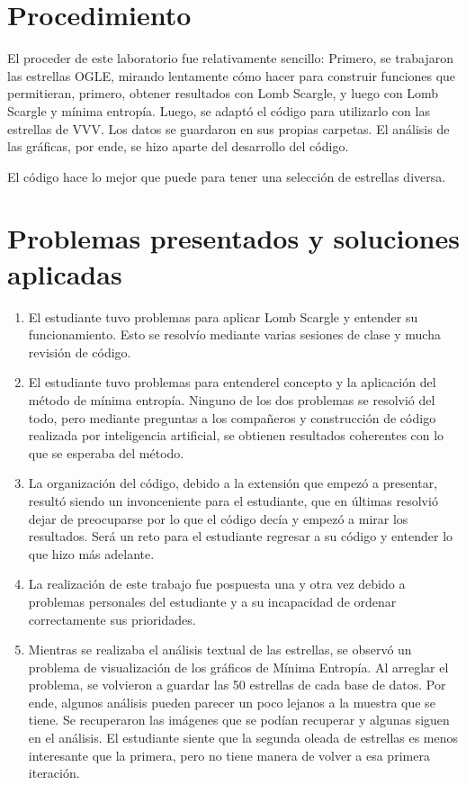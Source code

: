 \documentclass[10pt,twocolumn]{article}
\begin{document}
\section{Procedimiento}

El proceder de este laboratorio fue relativamente sencillo: Primero, se trabajaron las estrellas OGLE, mirando lentamente
cómo hacer para construir funciones que permitieran, primero, obtener resultados con Lomb Scargle, y luego con Lomb Scargle 
y mínima entropía. Luego, se adaptó el código para utilizarlo con las estrellas de VVV. Los datos se guardaron en sus propias 
carpetas. El análisis de las gráficas, por ende, se hizo aparte del desarrollo del código. 

El código hace lo mejor que puede para tener una selección de estrellas diversa. 

\section{Problemas presentados y soluciones aplicadas}

\begin{enumerate}
    \item El estudiante tuvo problemas para aplicar Lomb Scargle y entender su funcionamiento. Esto se resolvío mediante varias sesiones
    de clase y mucha revisión de código.
    \item El estudiante tuvo problemas para entenderel concepto y la aplicación del método de mínima entropía. Ninguno de los dos 
    problemas se resolvió del todo, pero mediante preguntas a los compañeros y construcción de código realizada por inteligencia artificial, 
    se obtienen resultados coherentes con lo que se esperaba del método.
    \item La organización del código, debido a la extensión que empezó a presentar, resultó siendo un invonceniente para el estudiante, que 
    en últimas resolvió dejar de preocuparse por lo que el código decía y empezó a mirar los resultados. Será un reto para el estudiante 
    regresar a su código y entender lo que hizo más adelante. 
    \item La realización de este trabajo fue pospuesta una y otra vez debido a problemas personales del estudiante y a su 
    incapacidad de ordenar correctamente sus prioridades.
    \item Mientras se realizaba el análisis textual de las estrellas, se observó un problema de visualización de los gráficos de Mínima 
    Entropía. Al arreglar el problema, se volvieron a guardar las 50 estrellas de cada base de datos. Por ende, algunos análisis pueden 
    parecer un poco lejanos a la muestra que se tiene. Se recuperaron las imágenes que se podían recuperar y algunas siguen en el 
    análisis. El estudiante siente que la segunda oleada de estrellas es menos interesante que la primera, pero no tiene manera de 
    volver a esa primera iteración. 
\end{enumerate}
\end{document}
